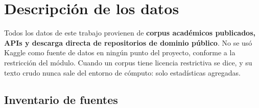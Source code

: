 \documentclass[11pt,a4paper]{article}
\begin{document}
\section{Descripción de los datos}
\label{sec:datos}

Todos los datos de este trabajo provienen de \textbf{corpus académicos publicados,
APIs y descarga directa de repositorios de dominio público}. No se usó Kaggle como
fuente de datos en ningún punto del proyecto, conforme a la restricción del módulo.
Cuando un corpus tiene licencia restrictiva se dice, y su texto crudo nunca sale del
entorno de cómputo: solo estadísticas agregadas.

\subsection{Inventario de fuentes}
\end{document}
